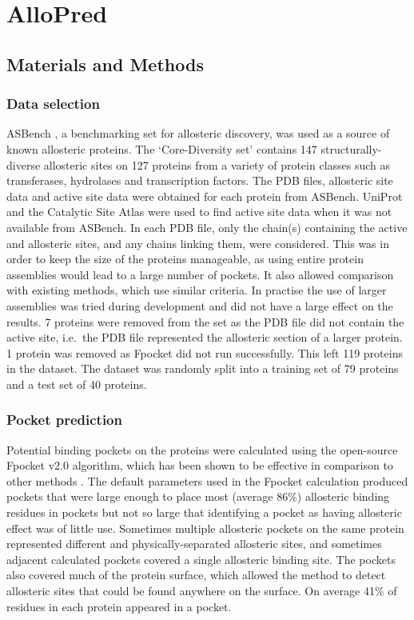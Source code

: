 \chapter{AlloPred}

\section{Materials and Methods}

\subsection{Data selection}

ASBench \cite{Huang2015}, a benchmarking set for allosteric discovery, was used as a source of known allosteric proteins.
The `Core-Diversity set' contains 147 structurally-diverse allosteric sites on 127 proteins from a variety of protein classes such as transferases, hydrolases and transcription factors.
The PDB files, allosteric site data and active site data were obtained for each protein from ASBench.
UniProt \cite{TheUniProtConsortium2015} and the Catalytic Site Atlas \cite{Furnham2014} were used to find active site data when it was not available from ASBench.
In each PDB file, only the chain(s) containing the active and allosteric sites, and any chains linking them, were considered.
This was in order to keep the size of the proteins manageable, as using entire protein assemblies would lead to a large number of pockets.
It also allowed comparison with existing methods, which use similar criteria.
In practise the use of larger assemblies was tried during development and did not have a large effect on the results.
7 proteins were removed from the set as the PDB file did not contain the active site, i.e.\ the PDB file represented the allosteric section of a larger protein.
1 protein was removed as Fpocket did not run successfully.
This left 119 proteins in the dataset.
The dataset was randomly split into a training set of 79 proteins and a test set of 40 proteins.


\subsection{Pocket prediction}

Potential binding pockets on the proteins were calculated using the open-source Fpocket v2.0 algorithm, which has been shown to be effective in comparison to other methods \cite{LeGuilloux2009}.
The default parameters used in the Fpocket calculation produced pockets that were large enough to place most (average 86\%) allosteric binding residues in pockets but not so large that identifying a pocket as having allosteric effect was of little use.
Sometimes multiple allosteric pockets on the same protein represented different and physically-separated allosteric sites, and sometimes adjacent calculated pockets covered a single allosteric binding site.
The pockets also covered much of the protein surface, which allowed the method to detect allosteric sites that could be found anywhere on the surface.
On average 41\% of residues in each protein appeared in a pocket.

